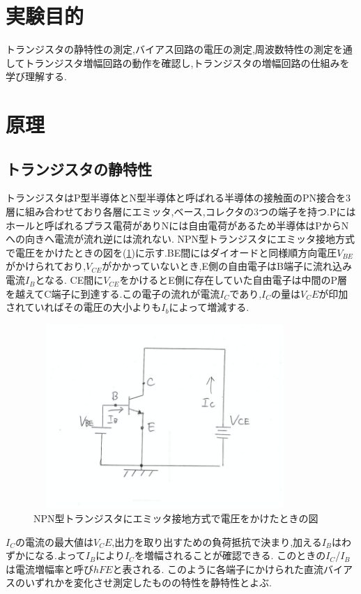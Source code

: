 \documentclass[a4j,10pt,dvipdfmx]{jarticle}
\author{学籍番号2120029, 氏名 政野玄空}
\date{2023年6月4日}
\begin{document}
\section{実験目的}
トランジスタの静特性の測定,バイアス回路の電圧の測定,周波数特性の測定を通してトランジスタ増幅回路の動作を確認し,トランジスタの増幅回路の仕組みを学び理解する.
\section{原理}
\subsection{トランジスタの静特性}
トランジスタはP型半導体とN型半導体と呼ばれる半導体の接触面のPN接合を3層に組み合わせており各層にエミッタ,ベース,コレクタの3つの端子を持つ.Pにはホールと呼ばれるプラス電荷がありNには自由電荷があるため半導体はPからNへの向きへ電流が流れ逆には流れない.
NPN型トランジスタにエミッタ接地方式で電圧をかけたときの図を(\ref{npn})に示す.BE間にはダイオードと同様順方向電圧$V_{BE}$がかけられており,$V_{CE}$がかかっていないとき,E側の自由電子はB端子に流れ込み電流$I_B$となる.
CE間に$V_{CE}$をかけるとE側に存在していた自由電子は中間のP層を越えてC端子に到達する.この電子の流れが電流$I_C$であり,$I_C$の量は$V_CE$が印加されていればその電圧の大小よりも$I_b$によって増減する.
\begin{figure}[H]
  \label{npn}
  \begin{center}
  \includegraphics[height=7cm,width=10cm]{NPN.png}
  \caption{NPN型トランジスタにエミッタ接地方式で電圧をかけたときの図}
\end{center}
\end{figure}
$I_C$の電流の最大値は$V_CE$,出力を取り出すための負荷抵抗で決まり,加える$I_B$はわずかになる.よって$I_B$により$I_C$を増幅されることが確認できる.
このときの$I_C$/$I_B$は電流増幅率と呼び$hFE$と表される.
このように各端子にかけられた直流バイアスのいずれかを変化させ測定したものの特性を静特性とよぶ.
\end{document}
